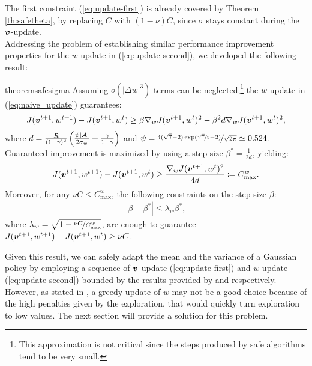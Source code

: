The first constraint (\ref{eq:update-first}) is already covered by Theorem \ref{th:safetheta}, by replacing $C$ with $(1-\nu)C$, since $\sigma$ stays constant during the $\vv$-update. \\
Addressing the problem of establishing similar performance improvement properties for the $w$-update in (\ref{eq:update-second}), we developed the following result:
\begin{restatable}[]{theorem}{safesigma}\label{th:safesigma}
	Assuming $o(|\Delta w|^3)$ terms can be neglected,\footnote{This approximation is not critical since the steps produced by safe algorithms tend to be very small.} the $w$-update in (\ref{eq:naive_update}) guarantees:
	\begin{align}\label{stat:2_1}
	J(\vv^{t+1}, w^{t+1}) - J(\vv^{t+1}, w^t) \geq \beta\gradJ[w]{\vv^{t+1}, w^t}^2 - \beta^2 d\gradJ[w]{\vv^{t+1}, w^t}^2,
	\end{align}
	where $d=\frac{R}{(1-\gamma)^2}\left(\frac{\psi|\Aspace|}{2\sigma_{w}}+\frac{\gamma}{1-\gamma}\right)$ and $\psi = \nicefrac{4(\sqrt{7} - 2)\exp(\nicefrac{\sqrt{7}}{2} - 2)}{\sqrt{2\pi}} \simeq 0.524$. Guaranteed improvement is maximized by using a step size $\beta^*=\frac{1}{2d}$, yielding:
	\begin{align}\label{stat:2_2}
	J(\vv^{t+1},w^{t+1}) - J(\vv^{t+1}, w^t) \geq \frac{\gradJ[w]{\vv^{t+1}, w^t}^2}{4d}
	\coloneqq C_{\text{max}}^w. 
	\end{align}
	Moreover, for any $\nu C\leq C_{\text{max}}^{w}$, the following constraints on the step-size $\beta$:
	\begin{align}\label{stat:2_3}
	|\beta - \beta^*| \leq \lambda_{w}\beta^*, 
	\end{align}
	where $\lambda_{w}=\sqrt{1 - \nicefrac{\nu C}{C_{\text{max}}^{w}}}$, are enough to guarantee $J(\vv^{t+1},w^{t+1}) - J(\vv^{t+1},w^t)\geq \nu C$.
\end{restatable}

Given this result, we can safely adapt the mean and the variance of a Gaussian policy by employing a sequence of $\vv$-update (\ref{eq:update-first}) and $w$-update (\ref{eq:update-second}) bounded by the results provided by  and  respectively. However, as stated in , a greedy update of $w$ may not be a good choice because of the high penalties given by the exploration, that would quickly turn exploration to low values. The next section will provide a solution for this problem.

